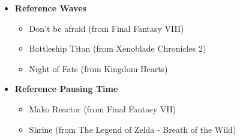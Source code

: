 \documentclass[12pt]{article}
\begin{document}
\begin{itemize}
	\item \textbf{Reference Waves}
	\begin{itemize}
		\item Don’t be afraid (from Final Fantasy VIII)
		\item Battleship Titan (from Xenoblade Chronicles 2)
		\item Night of Fate (from Kingdom Hearts)
	\end{itemize}
	\item \textbf{Reference Pausing Time}
	\begin{itemize}
		\item Mako Reactor (from Final Fantasy VII)
		\item Shrine (from The Legend of Zelda - Breath of the Wild)
	\end{itemize}
\end{itemize}


\end{document}
